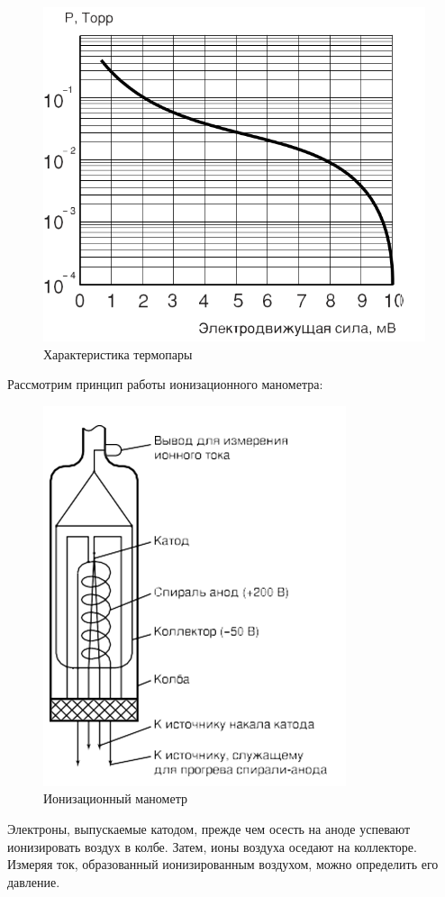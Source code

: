 \documentclass[12pt]{article}
\begin{document}
\begin{figure}[H]
	\centering
	\includegraphics[scale = 0.3]{./images/TChar.png}
	\caption{{Характеристика термопары}}
\end{figure}

Рассмотрим принцип работы ионизационного манометра:

\begin{figure}[H]
	\centering
	\includegraphics[scale = 0.5]{./images/IonLamp.png}
	\caption{{Ионизационный манометр}}
\end{figure}
Электроны, выпускаемые катодом, прежде чем осесть на аноде успевают ионизировать воздух в колбе. Затем, ионы воздуха оседают на коллекторе. Измеряя ток, образованный ионизированным воздухом, можно определить его давление.
\end{document}
